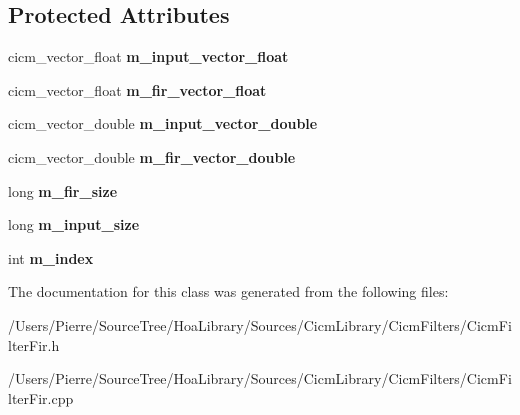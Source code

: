 \subsection*{Protected Attributes}
\begin{DoxyCompactItemize}
\item 
\hypertarget{class_filter_fir_a204586c6c22187d03c92346566f68944}{cicm\-\_\-vector\-\_\-float {\bfseries m\-\_\-input\-\_\-vector\-\_\-float}}\label{class_filter_fir_a204586c6c22187d03c92346566f68944}

\item 
\hypertarget{class_filter_fir_a792605ba286cd9a3b8ea7b612459ea1c}{cicm\-\_\-vector\-\_\-float {\bfseries m\-\_\-fir\-\_\-vector\-\_\-float}}\label{class_filter_fir_a792605ba286cd9a3b8ea7b612459ea1c}

\item 
\hypertarget{class_filter_fir_a20a039f8b4d1dbf4b46b47eedf824aed}{cicm\-\_\-vector\-\_\-double {\bfseries m\-\_\-input\-\_\-vector\-\_\-double}}\label{class_filter_fir_a20a039f8b4d1dbf4b46b47eedf824aed}

\item 
\hypertarget{class_filter_fir_a87ef3193899057d49eead0b4c55fec1b}{cicm\-\_\-vector\-\_\-double {\bfseries m\-\_\-fir\-\_\-vector\-\_\-double}}\label{class_filter_fir_a87ef3193899057d49eead0b4c55fec1b}

\item 
\hypertarget{class_filter_fir_a70cae5301d675bbe832c909f022970e3}{long {\bfseries m\-\_\-fir\-\_\-size}}\label{class_filter_fir_a70cae5301d675bbe832c909f022970e3}

\item 
\hypertarget{class_filter_fir_a87367acd803abc67b181105aaf7d8a4c}{long {\bfseries m\-\_\-input\-\_\-size}}\label{class_filter_fir_a87367acd803abc67b181105aaf7d8a4c}

\item 
\hypertarget{class_filter_fir_adfcca9b4de9698e5fab8c0de8f51b7be}{int {\bfseries m\-\_\-index}}\label{class_filter_fir_adfcca9b4de9698e5fab8c0de8f51b7be}

\end{DoxyCompactItemize}


The documentation for this class was generated from the following files\-:\begin{DoxyCompactItemize}
\item 
/\-Users/\-Pierre/\-Source\-Tree/\-Hoa\-Library/\-Sources/\-Cicm\-Library/\-Cicm\-Filters/Cicm\-Filter\-Fir.\-h\item 
/\-Users/\-Pierre/\-Source\-Tree/\-Hoa\-Library/\-Sources/\-Cicm\-Library/\-Cicm\-Filters/Cicm\-Filter\-Fir.\-cpp\end{DoxyCompactItemize}
